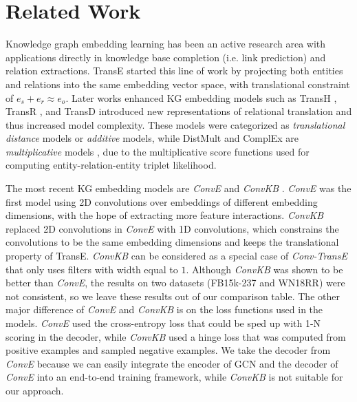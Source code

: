 \documentclass[letterpaper]{article} \usepackage{aaai19}  \usepackage{times}  \usepackage{helvet}  \usepackage{courier}  \usepackage{url}  \usepackage{graphicx}  \usepackage{amsmath}
\begin{document}
\section{Related Work}

Knowledge graph embedding learning has been an active research area with applications directly in knowledge base completion (i.e. link prediction) and relation extractions. TransE \cite{bordes2013translating} started this line of work by projecting both entities and relations into the same embedding vector space, with translational constraint of $e_{s} + e_{r} \approx e_{o}$. Later works enhanced KG embedding models such as TransH \cite{wang2014knowledge}, TransR \cite{lin2015learning}, and TransD \cite{ji2015knowledge} introduced new representations of relational translation and thus increased model complexity. These models were categorized as {\it translational distance}  models \cite{wang2017knowledge} or {\it additive} models, while DistMult \cite{yang2014distmult} and ComplEx \cite{trouillon2016complex} are {\it multiplicative} models \cite{sharma2018towards}, due to the multiplicative score functions used for computing entity-relation-entity triplet likelihood.

The most recent KG embedding models are {\it ConvE} \cite{dettmers2017conve} and {\it ConvKB} \cite{nguyen2017novel}. {\it ConvE} was the first model using 2D convolutions over embeddings of different embedding dimensions, with the hope of extracting more feature interactions. {\it ConvKB} replaced 2D convolutions in {\it ConvE} with 1D convolutions, which constrains the convolutions to be the same embedding dimensions and keeps the translational property of TransE. {\it ConvKB} can be considered as a special case of {\it Conv-TransE} that only uses filters with width equal to $1$. Although {\it ConvKB} was shown to be better than {\it ConvE}, the results on two datasets (FB15k-237 and WN18RR) were not consistent, so we leave these results out of our comparison table. The other major difference of {\it ConvE} and {\it ConvKB} is on the loss functions used in the models. {\it ConvE} used the cross-entropy loss that could be sped up with 1-N scoring in the decoder, while {\it ConvKB} used a hinge loss that was computed from positive examples and sampled negative examples. We take the decoder from {\it ConvE} because we can easily integrate the encoder of GCN and the decoder of {\it ConvE} into an end-to-end training framework, while {\it ConvKB} is not suitable for our approach.
\end{document}
